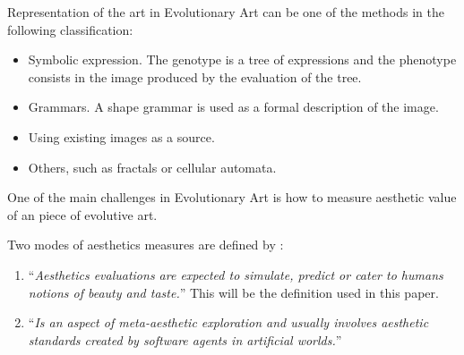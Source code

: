 \documentclass[conference]{IEEEtran}
\begin{document}
Representation of the art in Evolutionary Art can be one of the methods in the following classification:
\begin{itemize}
	\item Symbolic expression. The genotype is a tree of expressions and the phenotype consists in the image produced  by the evaluation of the tree.
	\item Grammars. A shape grammar is used as a formal description of the image.
	\item Using existing images as a source. 
	\item Others, such as fractals or cellular automata.
\end{itemize}

One of the main challenges in Evolutionary Art is how to measure aesthetic value of an piece of evolutive art.

Two modes of aesthetics measures are defined by \cite{galanter2012computational}: 
\begin{enumerate}
\item ``{\em Aesthetics evaluations are expected to simulate, predict or cater to humans notions of beauty and taste.}'' This will be the definition used in this paper. 
\item ``{\em Is an aspect of meta-aesthetic exploration and usually involves aesthetic standards created by software agents in artificial worlds.}''
\end{enumerate}
\end{document}
